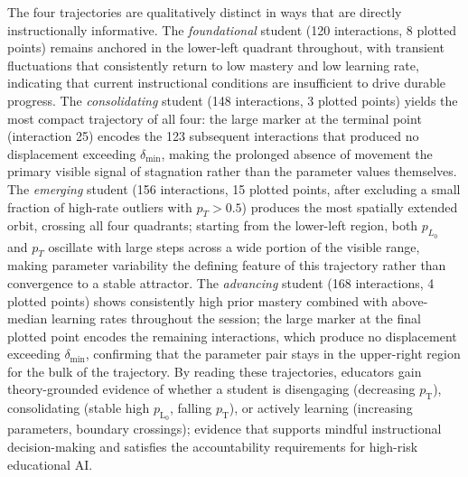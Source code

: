 \documentclass[runningheads]{llncs}
\begin{document}
The four trajectories are qualitatively distinct in ways that are directly instructionally informative. The \textit{foundational} student (120 interactions, 8 plotted points) remains anchored in the lower-left quadrant throughout, with transient fluctuations that consistently return to low mastery and low learning rate, indicating that current instructional conditions are insufficient to drive durable progress. The \textit{consolidating} student (148 interactions, 3 plotted points) yields the most compact trajectory of all four: the large marker at the terminal point (interaction 25) encodes the 123 subsequent interactions that produced no displacement exceeding $\delta_{\min}$, making the prolonged absence of movement the primary visible signal of stagnation rather than the parameter values themselves. The \textit{emerging} student (156 interactions, 15 plotted points, after excluding a small fraction of high-rate outliers with $p_T > 0.5$) produces the most spatially extended orbit, crossing all four quadrants; starting from the lower-left region, both $p_{L_0}$ and $p_T$ oscillate with large steps across a wide portion of the visible range, making parameter variability the defining feature of this trajectory rather than convergence to a stable attractor. The \textit{advancing} student (168 interactions, 4 plotted points) shows consistently high prior mastery combined with above-median learning rates throughout the session; the large marker at the final plotted point encodes the remaining interactions, which produce no displacement exceeding $\delta_{\min}$, confirming that the parameter pair stays in the upper-right region for the bulk of the trajectory. By reading these trajectories, educators gain theory-grounded evidence of whether a student is disengaging (decreasing $p_{\text{T}}$), consolidating (stable high $p_{\text{L}_0}$, falling $p_{\text{T}}$), or actively learning (increasing parameters, boundary crossings); evidence that supports mindful instructional decision-making and satisfies the accountability requirements for high-risk educational AI.
\end{document}
